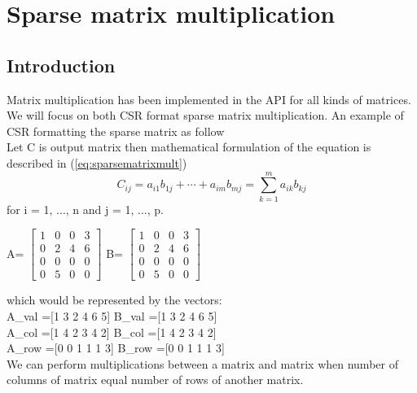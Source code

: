 \section{Sparse matrix multiplication}
\subsection{Introduction}
Matrix multiplication has been implemented in the API for all kinds of matrices. We will focus on both CSR format sparse matrix multiplication. An example of CSR formatting the sparse matrix as follow\\

Let C is output matrix then mathematical formulation of the equation is described in (\ref{eq:sparsematrixmult})\\
\begin{equation}
\label{eq:sparsematrixmult}
	C_{ij}=a_{i1}b_{1j}+\cdots +a_{im}b_{mj}=\sum _{k=1}^{m}a_{ik}b_{kj}
\end{equation}
for i = 1, ..., n and j = 1, ..., p.\\
\begin{center}
	A= $\begin{bmatrix}
	1&0&0&3\\
	0&2&4&6\\
	0&0&0&0\\
	0&5&0&0
\end{bmatrix}$ B= $\begin{bmatrix}
	1&0&0&3\\
	0&2&4&6\\
	0&0&0&0\\
	0&5&0&0
\end{bmatrix}$
\end{center}

which would be represented by the vectors:\\
	A\_val =[1 3 2 4 6 5] \quad     B\_val =[1 3 2 4 6 5]\\
	A\_col =[1 4 2 3 4 2]  \quad    B\_col =[1 4 2 3 4 2]\\
	A\_row =[0 0 1 1 1 3]  \quad    B\_row =[0 0 1 1 1 3]\\


We can perform multiplications between a matrix and matrix when number of columns of matrix equal number of rows of another matrix.
